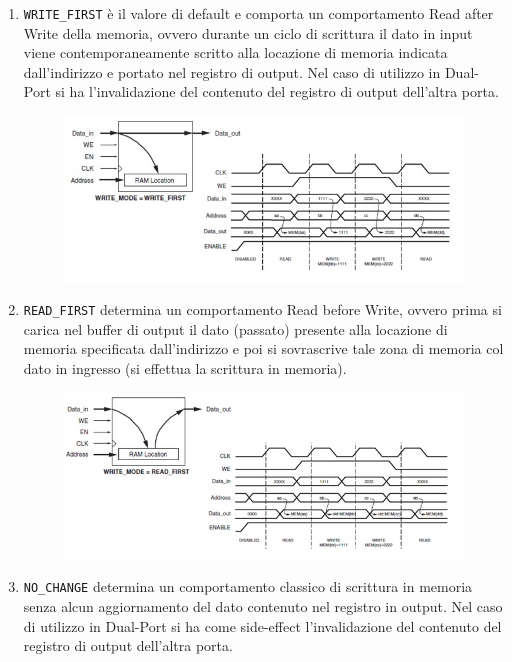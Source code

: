 \begin{itemize}
\begin{enumerate}
\item \texttt{WRITE\_FIRST} \`e  il valore di default e comporta un comportamento Read after Write della memoria, ovvero durante un ciclo di scrittura il dato in input viene contemporaneamente scritto alla locazione di memoria indicata dall'indirizzo e portato nel registro di output. 
Nel caso di utilizzo in Dual-Port si ha l'invalidazione del contenuto del registro di output dell'altra porta.

\begin{figure}[!h]
\centering
\includegraphics[width=\textwidth]{img/blockRam/writeFirst.jpg}
\label{fig:set_ass}
\end{figure}

\item \texttt{READ\_FIRST} determina un comportamento Read before Write, ovvero prima si carica nel buffer di output il dato (passato) presente alla locazione di memoria specificata dall'indirizzo e poi si sovrascrive tale zona di memoria col dato in ingresso (si effettua la scrittura in memoria). 

\begin{figure}[!h]
\centering
\includegraphics[width=\textwidth]{img/blockRam/readFirst.jpg}
\label{fig:set_ass}
\end{figure}

\item \texttt{NO\_CHANGE} determina un comportamento classico di scrittura in memoria senza alcun aggiornamento del dato contenuto nel registro in output. Nel caso di utilizzo in Dual-Port si ha come side-effect l'invalidazione del contenuto del registro di output dell'altra porta.
\end{enumerate}


\end{itemize}
